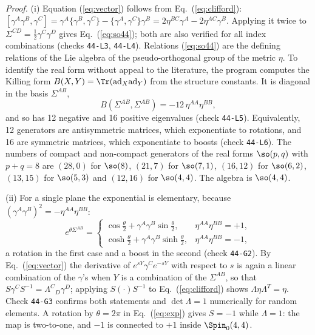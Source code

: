 \emph{Proof.} (i) Equation (\ref{eq:vector}) follows from Eq.~(\ref{eq:clifford}):
$[\gamma^A\gamma^B,\gamma^C]=\gamma^A\{\gamma^B,\gamma^C\}-\{\gamma^A,\gamma^C\}\gamma^B
=2\eta^{BC}\gamma^A-2\eta^{AC}\gamma^B$. Applying it twice to $\Sigma^{CD}=\tfrac12\gamma^C\gamma^D$
gives Eq.~(\ref{eq:so44}); both are also verified for all index combinations (checks
\texttt{44-L3}, \texttt{44-L4}). Relations (\ref{eq:so44}) are the defining relations of the Lie
algebra of the pseudo-orthogonal group of the metric $\eta$. To identify the real form without appeal
to the literature, the program computes the Killing form
$B(X,Y)=\Tr(\mathrm{ad}_X\mathrm{ad}_Y)$ from the structure constants. It is diagonal in the basis
$\Sigma^{AB}$,
\begin{equation}
B(\Sigma^{AB},\Sigma^{AB})=-12\,\eta^{AA}\eta^{BB},
\label{eq:killing}
\end{equation}
and so has 12 negative and 16 positive eigenvalues (check \texttt{44-L5}). Equivalently, 12
generators are antisymmetric matrices, which exponentiate to rotations, and 16 are symmetric matrices,
which exponentiate to boosts (check \texttt{44-L6}). The numbers of compact and non-compact generators
of the real forms $\so(p,q)$ with $p+q=8$ are $(28,0)$ for $\so(8)$, $(21,7)$ for $\so(7,1)$,
$(16,12)$ for $\so(6,2)$, $(13,15)$ for $\so(5,3)$ and $(12,16)$ for $\so(4,4)$. The algebra is
$\so(4,4)$.

(ii) For a single plane the exponential is elementary, because
$(\gamma^A\gamma^B)^2=-\eta^{AA}\eta^{BB}$:
\begin{equation}
e^{\theta\Sigma^{AB}}=\begin{cases}\cos\frac\theta2+\gamma^A\gamma^B\sin\frac\theta2,&\eta^{AA}\eta^{BB}=+1,\\[3pt]
\cosh\frac\theta2+\gamma^A\gamma^B\sinh\frac\theta2,&\eta^{AA}\eta^{BB}=-1,\end{cases}
\label{eq:exp}
\end{equation}
a rotation in the first case and a boost in the second (check \texttt{44-G2}). By
Eq.~(\ref{eq:vector}) the derivative of $e^{sY}\gamma^Ce^{-sY}$ with respect to $s$ is again a linear
combination of the $\gamma$'s when $Y$ is a combination of the $\Sigma^{AB}$, so that
$S\gamma^CS^{-1}=\Lambda^C{}_D\gamma^D$; applying $S(\cdot)S^{-1}$ to Eq.~(\ref{eq:clifford}) shows
$\Lambda\eta\Lambda^T=\eta$. Check \texttt{44-G3} confirms both statements and $\det\Lambda=1$
numerically for random elements. A rotation by $\theta=2\pi$ in Eq.~(\ref{eq:exp}) gives $S=-1$ while
$\Lambda=1$: the map is two-to-one, and $-1$ is connected to $+1$ inside $\Spin_0(4,4)$.

